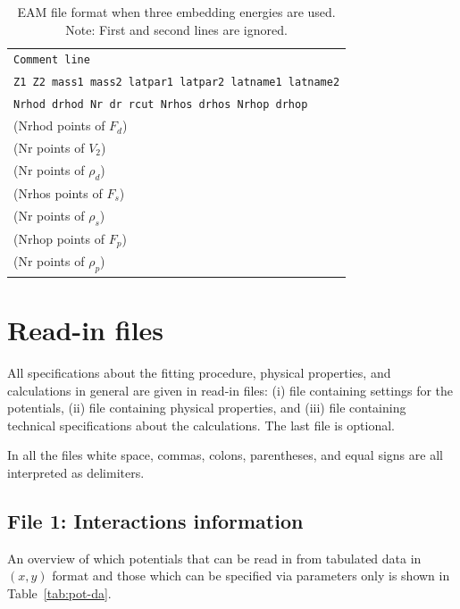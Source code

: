 \documentclass[a4paper,12pt,onecolumn]{article}
\begin{document}
\begin{table}[!h]
\caption{
EAM file format when three embedding energies are used.
Note: First and second lines are ignored.
\label{tab:kw-eam-ff3}
}
\begin{center}
\begin{tabular}{|l|}
\hline
\hline
\verb+Comment line+ \\
\verb+Z1 Z2 mass1 mass2 latpar1 latpar2 latname1 latname2+ \\
\verb+Nrhod drhod Nr dr rcut Nrhos drhos Nrhop drhop+ \\
(Nrhod points of $F_d$) \\
(Nr points of $V_2$) \\
(Nr points of $\rho_d$) \\
(Nrhos points of $F_s$) \\
(Nr points of $\rho_s$) \\
(Nrhop points of $F_p$) \\
(Nr points of $\rho_p$) \\
\hline
\hline
\end{tabular}
\end{center}
\end{table}








\section{Read-in files}


All specifications about the fitting procedure, physical properties,
and calculations in general are given in read-in files:
(i) file containing settings for the potentials,
(ii) file containing physical properties, and
(iii) file containing technical specifications about the
calculations. The last file is optional.

In all the files white space, commas, colons, parentheses, and equal signs
are all interpreted as delimiters.




\subsection{File 1: Interactions information}


An overview of which potentials that can be read in from tabulated data
in $(x, y)$ format and those which can be specified via parameters only
is shown in Table~\ref{tab:pot-da}.
\end{document}
